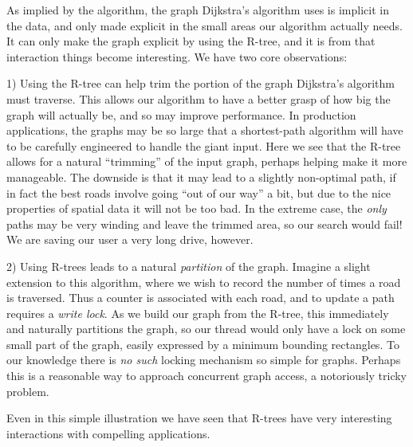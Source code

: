 As implied by the algorithm, the graph Dijkstra's algorithm uses is implicit in the data, and only made explicit in the small areas our algorithm actually needs.
It can only make the graph explicit by using the R-tree, and it is from that interaction things become interesting.
We have two core observations:

1) Using the R-tree can help trim the portion of the graph Dijkstra's algorithm must traverse.
This allows our algorithm to have a better grasp of how big the graph will actually be, and so may improve performance.
In production applications, the graphs may be so large that a shortest-path algorithm will have to be carefully engineered to handle the giant input.
Here we see that the R-tree allows for a natural ``trimming'' of the input graph, perhaps helping make it more manageable.
The downside is that it may lead to a slightly non-optimal path, if in fact the best roads involve going ``out of our way'' a bit, but due to the nice properties of spatial data it will not be too bad.
In the extreme case, the \emph{only} paths may be very winding and leave the trimmed area, so our search would fail!
We are saving our user a very long drive, however.

2) Using R-trees leads to a natural \emph{partition} of the graph.
Imagine a slight extension to this algorithm, where we wish to record the number of times a road is traversed.
Thus a counter is associated with each road, and to update a path requires a \emph{write lock}.
As we build our graph from the R-tree, this immediately and naturally partitions the graph, so our thread would only have a lock on some small part of the graph, easily expressed by a minimum bounding rectangles.
To our knowledge there is \emph{no such} locking mechanism so simple for graphs.
Perhaps this is a reasonable way to approach concurrent graph access, a notoriously tricky problem.

Even in this simple illustration we have seen that R-trees have very interesting interactions with compelling applications.
